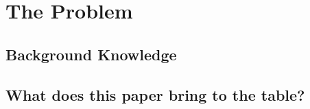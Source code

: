 \section{The Problem}

\subsection{Background Knowledge}


\subsection{What does this paper bring to the table?}


